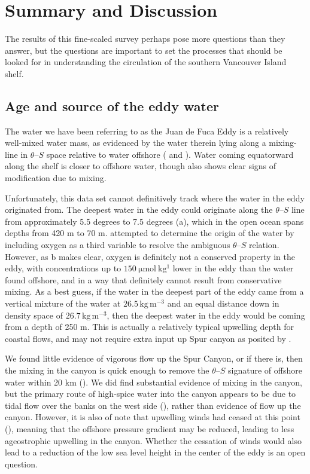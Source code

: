 \documentclass[draft]{agujournal2019}
\begin{document}
\section{Summary and Discussion}
\label{sec:Summary}

The results of this fine-scaled survey perhaps pose more questions than they answer, but the questions are important to set the processes that should be looked for in understanding the circulation of the southern Vancouver Island shelf.

\subsection{Age and source of the eddy water}

The water we have been referring to as the Juan de Fuca Eddy is a relatively well-mixed water mass, as evidenced by the water therein lying along a mixing-line in $\theta$--$S$ space relative to water offshore ( and ).  Water coming equatorward along the shelf is closer to offshore water, though also shows clear signs of modification due to mixing.

Unfortunately, this data set cannot definitively track where the water in the eddy originated from.  The deepest water in the eddy could originate along the $\theta$--$S$ line from approximately 5.5 degrees to 7.5 degrees (a), which in the open ocean spans depths from 420 m to 70 m.   attempted to determine the origin of the water by including oxygen as a third variable to resolve the ambiguous $\theta$--$S$ relation.  However, as b makes clear, oxygen is definitely not a conserved property in the eddy, with concentrations up to $150 \ \mathrm{\mu mol\ kg^{1}}$ lower in the eddy than the water found offshore, and in a way that definitely cannot result from conservative mixing.  As a best guess, if the water in the deepest part of the eddy came from a vertical mixture of the water at $26.5\,\mathrm{kg\,m^{-3}}$ and an equal distance down in density space of $26.7\,\mathrm{kg\,m^{-3}}$, then the deepest water in the eddy would be coming from a depth of 250 m.  This is actually a relatively typical upwelling depth for coastal flows, and may not require extra input up Spur canyon as posited by .

We found little evidence of vigorous flow up the Spur Canyon, or if there is, then the mixing in the canyon is quick enough to remove the $\theta$--$S$ signature of offshore water within 20 km ().  We did find substantial evidence of mixing in the canyon, but the primary route of high-spice water into the canyon appears to be due to tidal flow over the banks on the west side (), rather than evidence of flow up the canyon.  However, it is also of note that upwelling winds had ceased at this point (), meaning that the offshore pressure gradient may be reduced, leading to less ageostrophic upwelling in the canyon.  Whether the cessation of winds would also lead to a reduction of the low sea level height in the center of the eddy is an open question.
\end{document}
